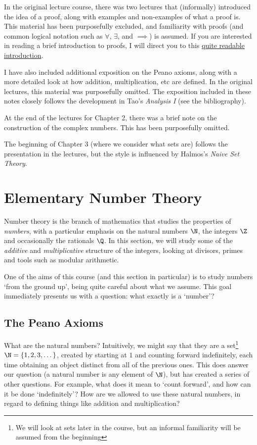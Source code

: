 \documentclass[a4paper]{scrreprt}
\begin{document}
In the original lecture course, there was two lectures that (informally) introduced the idea of a proof, along with examples and non-examples of what a proof is. This material has been purposefully excluded, and familiarity with proofs (and common logical notation such as $\forall$, $\exists$, and $\implies$) is assumed. 
If you are interested in reading a brief introduction to proofs, I will direct you to this \href{https://math.berkeley.edu/~hutching/teach/proofs.pdf}{quite readable introduction}.

I have also included additional exposition on the Peano axioms, along with a more detailed look at how addition, multiplication, etc are defined. In the original lectures, this material was purposefully omitted. The exposition included in these notes closely follows the development in Tao's \emph{Analysis I} (see the bibliography).

At the end of the lectures for Chapter 2, there was a brief note on the construction of the complex numbers. This has been purposefully omitted.

The beginning of Chapter 3 (where we consider what sets are) follows the presentation in the lectures, but the style is influenced by Halmos's \emph{Naive Set Theory}.

\clearpage


\chapter{Elementary Number Theory}\label{ch:1}

Number theory is the branch of mathematics that studies the properties of \emph{numbers}, with a particular emphasis on the natural numbers $\N$, the integers $\Z$ and occasionally the rationals $\Q$. In this section, we will study some of the \emph{additive} and \emph{multiplicative} structure of the integers, looking at divisors, primes and tools such as modular arithmetic. 

One of the aims of this course (and this section in particular) is to study numbers `from the ground up', being quite careful about what we assume. This goal immediately presents us with a question: what exactly is a `number'?


\section{The Peano Axioms}

What are the natural numbers? Intuitively, we might say that they are a set\footnote{We will look at sets later in the course, but an informal familiarity will be assumed from the beginning} $\N = \{1, 2, 3, \dots\}$, created by starting at $1$ and counting forward indefinitely, each time obtaining an object distinct from all of the previous ones.
	This does answer our question (a natural number is any element of $\N$), but has created a series of other questions. For example, what does it mean to `count forward', and how can it be done `indefinitely'? How are we allowed to use these natural numbers, in regard to defining things like addition and multiplication? 
	
\end{document}
